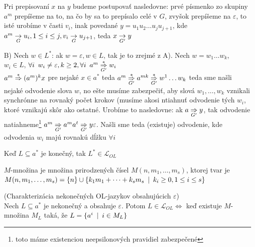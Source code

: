 \begin{dokaz}
\begin{enumerate}
\begin{description}
\begin{description}
\begin{description}
        Pri prepisovaní $x$ na $y$ budeme postupovať nasledovne: prvé
        písmenko zo skupiny $a^{m}$ prepíšeme na to, na čo by sa to
        prepísalo celé v $G$, zvyšok prepíšeme na $\varepsilon$, to isté
        urobíme v časti $v_{i}$, inak povedané $y=u_{1}u_{2}\dots
        u_{j}u_{j+1}$, kde $a^{m}\underset{G}{\rightarrow} u_{i},1\leq i\leq j,
        v_{i}\underset{G}{\rightarrow} u_{j+1}$, teda $x\underset{G'}{\rightarrow} y$

        \end{description}
        \item{B)} Nech $w\in L^{*}$: ak $w=\varepsilon, w\in L$, tak je to
        zrejmé z A). Nech $w=w_{1}\dots w_{k},$ \mbox{$w_{i}\in L$},
        $\forall i\enspace w_{i}\neq\varepsilon, k\geq2,\forall i\enspace
        a^{m}\overset{*}{\underset{G'}\Rightarrow}w_{i}$\\
        $a^{m}\overset{*}{\Rightarrow} (a^{m})^{k}x$ pre nejaké $x\in a^{*}$ teda
        $a^{m}\overset{*}{\underset{G'}{\Rightarrow}}a^{mk}\overset{*}{\underset{G'}{\Rightarrow}}
        w^{1}\dots w_{k}$ teda sme našli nejaké odvodenie slova $w$, no
        ešte musíme zabezpečiť, aby slová $w_{1},\dots,w_{k}$ vznikali
        synchrónne na rovnaký počet krokov (musíme akosi ntiahnuť
        odvodenie tých $w_{i}$, ktoré vznikajú skôr ako ostatné. Urobíme
        to nasledovne: ak $a\underset{G'}{\Rightarrow} y$, tak odvodenie
        natiahneme\footnote{toto máme existenciou neepsilonových pravidiel
        zabezpečené} $a^{m}\underset{G'}{\Rightarrow} a^{m}a^{t}\underset{G'}{\Rightarrow}
        y\varepsilon$. Našli sme teda (existuje) odvodenie, kde odvodenia
        $w_{i}$ majú rovnakú dĺžku $\forall i$
        \end{description}
        \end{description}

    \end{enumerate}
\end{dokaz}

\begin{poznamka}
    Keď $L\subseteq a^{*}$ je konečný, tak $L^{*}\in\mathcal{L}_{OL}$
\end{poznamka}

\begin{definicia}
    $M$-množina je množina prirodzených čísel
    $M(n,m_{1},\dots,m_{s})$, ktorej tvar je
    \mbox{$M(n,m_{1},\dots,m_{s})=\{n\}\cup\{k_{1}m_{1}
    +\dots+k_{s}m_{s}\enspace |\enspace k_{i}\geq0,1\leq i\leq s\}$}
\end{definicia}

\begin{veta}
    \label{nekon_ol} (Charakterizácia nekonečných OL-jazykov
    obsahujúcich $\varepsilon$)
    \\ Nech $L\subseteq a^{*}$ je
    ne\-ko\-neč\-ný a obsahuje $\varepsilon$. Potom
    $L\in\mathcal{L}_{OL}\Longleftrightarrow$ keď existuje $M$-množina
    $M_{L}$ taká, že $L=\{a^{i}\enspace |\enspace i\in M_{L}\}$
\end{veta}

